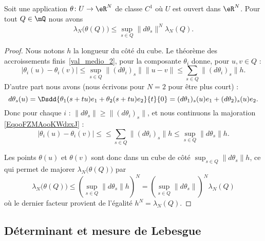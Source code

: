 \begin{lemma}      \label{LemooJCEDooBRyjRg}
	Soit une application \( \theta\colon U\to \eR^N\) de classe \( C^1\) où \( U\) est ouvert dans \( \eR^N\). Pour tout \( Q\in\mQ\) nous avons
	\begin{equation}
		\lambda_N\big( \theta(Q) \big)\leq\sup_{s\in Q}\| d\theta_s \|^N\lambda_N(Q).
	\end{equation}
\end{lemma}

\begin{proof}
	Nous notons \( h\) la longueur du côté du cube. Le théorème des accroissements finis~\ref{val_medio_2}, pour la composante \( \theta_i\) donne, pour \( u,v\in Q\) :
	\begin{equation}        \label{EqooFZMAooKWdzxJ}
		\big|  \theta_i(u)-\theta_i(v) \big|\leq\sup_{s\in Q}\| (d\theta_i)_s \|\| u-v \|\leq \sum_{s\in Q}\| (d\theta_i)_s \|h.
	\end{equation}
	D'autre part nous avons (nous écrivons pour \( N=2\) pour être plus court) :
	\begin{equation}
		d\theta_s(u)=\Dsdd{ \theta_1(s+tu)e_1+\theta_2(s+tu)e_2 }{t}{0}=(d\theta_1)_s(u)e_1+(d\theta_2)_s(u)e_2.
	\end{equation}
	Donc pour chaque \( i\) : \( \| d\theta_s \|\geq \| (d\theta_i)_s \|\), et nous continuons la majoration \eqref{EqooFZMAooKWdzxJ} :
	\begin{equation}
		\big|  \theta_i(u)-\theta_i(v) \big|\leq\leq \sum_{s\in Q}\| (d\theta_i)_s \|h\leq \sup_{s\in Q}\| d\theta_s \|h.
	\end{equation}

	Les points \( \theta(u)\) et \( \theta(v)\) sont donc dans un cube de côté \( \sup_{s\in Q}\| d\theta_s \|h\), ce qui permet de majorer \( \lambda_N\big( \theta(Q) \big)\) par
	\begin{equation}
		\lambda_N\big( \theta(Q) \big)\leq \left( \sup_{s\in Q}\| d\theta_s \|h \right)^N=\left( \sup_{s\in Q}\| d\theta_s \| \right)^N\lambda_N(Q)
	\end{equation}
	où le dernier facteur provient de l'égalité \( h^N=\lambda_N(Q)\).
\end{proof}

\subsection{Déterminant et mesure de Lebesgue}

